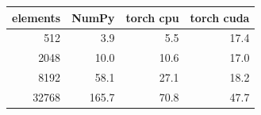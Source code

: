 \begin{tabular}{rrrr}
\toprule
elements & NumPy & torch cpu & torch cuda \\
\midrule
512 & 3.9 & 5.5 & 17.4 \\
2048 & 10.0 & 10.6 & 17.0 \\
8192 & 58.1 & 27.1 & 18.2 \\
32768 & 165.7 & 70.8 & 47.7 \\
\bottomrule
\end{tabular}
